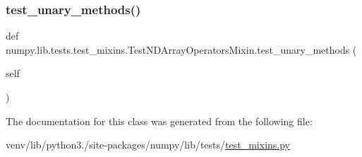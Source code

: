 \subsubsection{\texorpdfstring{test\+\_\+unary\+\_\+methods()}{test\_unary\_methods()}}
{\footnotesize\ttfamily def numpy.\+lib.\+tests.\+test\+\_\+mixins.\+Test\+N\+D\+Array\+Operators\+Mixin.\+test\+\_\+unary\+\_\+methods (\begin{DoxyParamCaption}\item[{}]{self }\end{DoxyParamCaption})}



The documentation for this class was generated from the following file\+:\begin{DoxyCompactItemize}
\item 
venv/lib/python3./site-\/packages/numpy/lib/tests/\hyperlink{test__mixins_8py}{test\+\_\+mixins.\+py}\end{DoxyCompactItemize}
